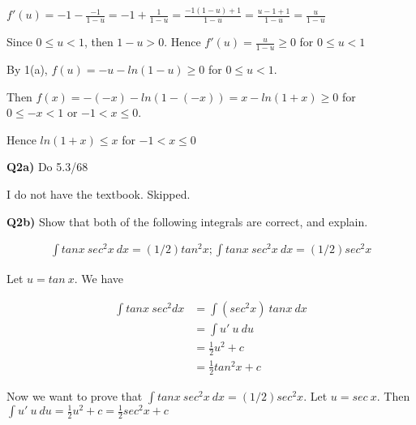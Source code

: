 \documentclass[9pt]{article}
\begin{document}
$f'(u) = -1 - \frac{-1}{1 - u} = -1 + \frac{1}{1-u} = \frac{-1(1-u) + 1}{1 - u} = \frac{u - 1 + 1}{1 - u} = \frac{u}{1 - u}$

Since $0 \leq u < 1$, then $1 - u > 0$. Hence $f'(u) = \frac{u}{1 - u} \geq 0$ for $0 \leq u < 1$

By 1(a), $f(u) = -u - ln(1 - u) \geq 0$ for $0 \leq u < 1$.

Then $f(x) = -(-x) - ln(1 - (-x)) = x - ln(1 + x) \geq 0$ for $0 \leq -x < 1$ or $-1 < x \leq 0$.

Hence $ln(1 + x) \leq x$ for $-1 < x \leq 0$


\begin{tcolorbox}
  \textbf{Q2a)} Do 5.3/68
\end{tcolorbox}

I do not have the textbook. Skipped.


\begin{tcolorbox}
  \textbf{Q2b)} Show that both of the following integrals are correct, and explain.

  \begin{align*}
    \int tan x\ sec^2 x\ dx = (1/2) tan^2 x; \int tan x\ sec^2 x\ dx = (1/2) sec^2 x
  \end{align*}
\end{tcolorbox}

Let $u = tan\ x$. We have

\begin{align*}
  \int tan x\ sec^2 dx &= \int (sec^2 x)\ tan x\ dx \\
                       &= \int u'\ u\ du \\
                       &= \frac{1}{2} u^2 + c \\
                       &= \frac{1}{2} tan^2 x + c
\end{align*}

Now we want to prove that $\int tan x\ sec^2 x\ dx = (1/2) sec^2 x$. Let $u = sec\ x$. Then $\int u' \ u\ du = \frac{1}{2}u^2 + c = \frac{1}{2} sec^2 x + c$
\end{document}
